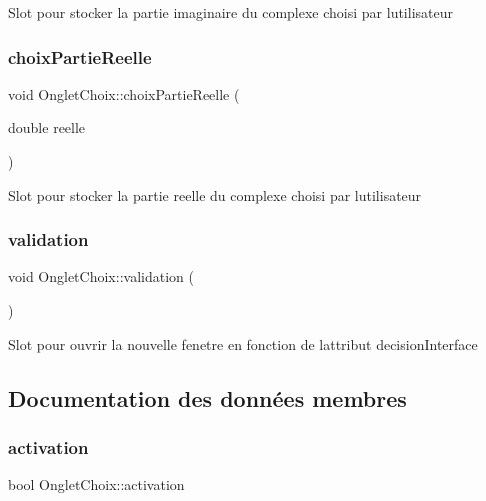 Slot pour stocker la partie imaginaire du complexe choisi par l\textquotesingle{}utilisateur \mbox{\label{classOngletChoix_ab9c4d2a0468d54825de329606731b676}} 
\subsubsection{\texorpdfstring{choix\+Partie\+Reelle}{choixPartieReelle}}
{\footnotesize\ttfamily void Onglet\+Choix\+::choix\+Partie\+Reelle (\begin{DoxyParamCaption}\item[{double}]{reelle }\end{DoxyParamCaption})\hspace{0.3cm}{\ttfamily [slot]}}

Slot pour stocker la partie reelle du complexe choisi par l\textquotesingle{}utilisateur \mbox{\label{classOngletChoix_ad3cd10f4288ef90f79088e2242d04930}} 
\subsubsection{\texorpdfstring{validation}{validation}}
{\footnotesize\ttfamily void Onglet\+Choix\+::validation (\begin{DoxyParamCaption}{ }\end{DoxyParamCaption})\hspace{0.3cm}{\ttfamily [slot]}}

Slot pour ouvrir la nouvelle fenetre en fonction de l\textquotesingle{}attribut decision\+Interface 

\subsection{Documentation des données membres}
\mbox{\label{classOngletChoix_a29c93f2a3b2c5a3c77df221706b9f038}} 
\subsubsection{\texorpdfstring{activation}{activation}}
{\footnotesize\ttfamily bool Onglet\+Choix\+::activation\hspace{0.3cm}{\ttfamily [private]}}

